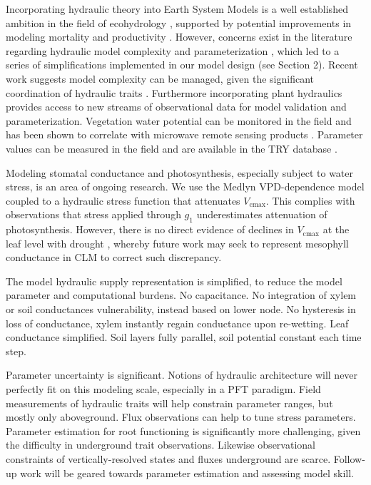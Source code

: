\documentclass[draft,linenumbers]{agujournal}
\begin{document}
  Incorporating hydraulic theory into Earth System Models is a well established ambition in the field of ecohydrology \citep{sperry2015}, supported by potential improvements in modeling mortality and productivity \citep{choat2012,mcdowell2018}.
    However, concerns exist in the literature regarding hydraulic model complexity and parameterization \citep{verhoef2014,drake2017}, 
    which led to a series of simplifications implemented in our model design (see Section 2).
    Recent work suggests model complexity can be managed, given the significant coordination of hydraulic traits \citep{bartlett2016,christoffersen2016}.
    Furthermore incorporating plant hydraulics provides access to new streams of observational data for model validation and parameterization.
    Vegetation water potential can be monitored in the field \citep{boyer1967} and has been shown to correlate with microwave remote sensing products \citep{momen2017}.
    Parameter values can be measured in the field \citep{sack2002} and are available in the TRY database \citep{kattge2011}.

Modeling stomatal conductance and photosynthesis, especially subject to water stress, is an area of ongoing research. We use the Medlyn VPD-dependence model coupled to a hydraulic stress function that attenuates $V_{\text{cmax}}$. This complies with observations \citep{lin2018,zhou2013} that stress applied through $g_1$ underestimates attenuation of photosynthesis. However, there is no direct evidence of declines in $V_{\text{cmax}}$ at the leaf level with drought \citep{flexas2006}, whereby future work may seek to represent mesophyll conductance in CLM to correct such discrepancy.
    
    The model hydraulic supply representation is simplified, to reduce the model parameter and computational burdens.
    No capacitance.
    No integration of xylem or soil conductances vulnerability, instead based on lower node.
    No hysteresis in loss of conductance, xylem instantly regain conductance upon re-wetting.
    Leaf conductance simplified.
    Soil layers fully parallel, soil potential constant each time step.
    
    Parameter uncertainty is significant.
    Notions of hydraulic architecture will never perfectly fit on this modeling scale, especially in a PFT paradigm.
    Field measurements of hydraulic traits will help constrain parameter ranges, but mostly only aboveground.
    Flux observations can help to tune stress parameters.
    Parameter estimation for root functioning is significantly more challenging, given the difficulty in underground trait observations.
    Likewise observational constraints of vertically-resolved states and fluxes underground are scarce.
    Follow-up work will be geared towards parameter estimation and assessing model skill.
\end{document}
